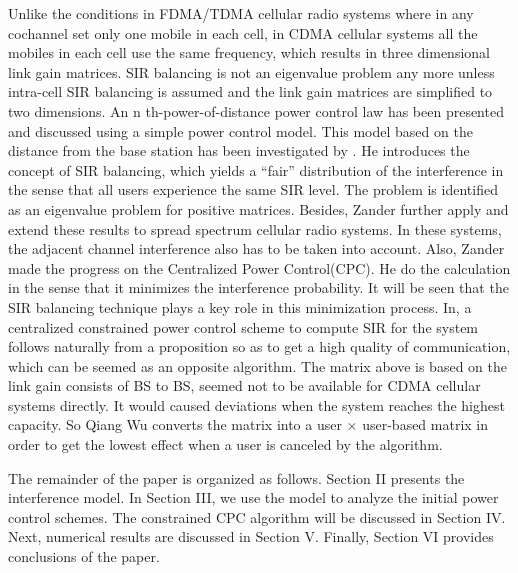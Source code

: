 \documentclass[conference]{IEEEtran}
\begin{document}
Unlike the conditions in FDMA/TDMA cellular radio systems where in any cochannel set only one mobile in each cell, in CDMA cellular systems all the mobiles in each cell use the same frequency, which results in three dimensional link gain matrices. SIR balancing is not an eigenvalue problem any more unless intra-cell SIR balancing is assumed and the link gain matrices are simplified to two dimensions\cite{nettleton1983power}. An n th-power-of-distance power control law has been presented and discussed using a simple power control model. This model based on the distance from the base station has been investigated by \cite{nettleton1983power}. He introduces the concept of SIR balancing, which yields a “fair” distribution of the interference in the sense that all users experience the same SIR level. The problem is identified as an eigenvalue problem for positive matrices. Besides, Zander further apply and extend these results to spread spectrum cellular radio systems. In these systems, the adjacent channel interference also has to be taken into account. Also, Zander made the progress on the Centralized Power Control(CPC). He do the calculation in the sense that it minimizes the interference probability. It will be seen that the SIR balancing technique plays a key role in this minimization process\cite{zander1992performance}. In\cite{grandhi1994constrained}, a centralized constrained power control scheme to compute SIR for the system follows naturally from a proposition so as to get a high quality of communication, which can be seemed as an opposite algorithm. The matrix above is based on the link gain consists of BS to BS, seemed not to be available for CDMA cellular systems directly. It would caused deviations when the system reaches the highest capacity. So Qiang Wu converts the matrix into a user $\times$ user-based matrix in order to get the lowest effect when a user is canceled by the algorithm\cite{grandhi1993centralized}\cite{wu1997centralised}.

The remainder of the paper is organized as follows. Section II presents the interference model. In Section III, we use the model to analyze the initial power control schemes. The constrained CPC algorithm will be discussed in Section IV. Next, numerical results are discussed in Section V. Finally, Section VI provides conclusions of the paper.
\end{document}
